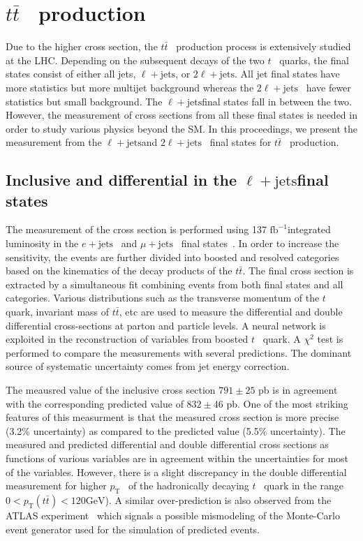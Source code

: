 \documentclass[submission, Proceedings]{SciPost}
\newcommand{\fbinv}{\ensuremath{{\text{fb}^{-1}}}{}}
\newcommand{\GeV}{\ensuremath{{\text{GeV}}}}
\newcommand{\pt}{\ensuremath{{p_\text{T}}}}
\newcommand{\Pe}{\ensuremath{{e}}}
\newcommand{\PQt}{\ensuremath{{t}}}
\newcommand{\PAQt}{\ensuremath{{\bar{t}}}}
\newcommand{\ttbar}{{\PQt\PAQt}}
\newcommand{\ljets}{\ensuremath{\ell + \text{jets}}}
\newcommand{\dilep}{\ensuremath{2\ell + \text{jets}}}
\newcommand{\mujets}{\ensuremath{\mu + \text{jets}}}
\newcommand{\ejets}{\ensuremath{\Pe + \text{jets}}}
\begin{document}
\section{\ttbar~ production}
\label{sec:tt}
Due to the higher cross section, the \ttbar~ production process is extensively studied at the LHC.
Depending on the subsequent decays of the two \PQt~ quarks, the final states consist of either all
jets, \ljets, or \dilep. All jet final states have more statistics but more multijet background whereas the \dilep~ have fewer statistics but small background. The \ljets final states fall in 
between the two. However, the measurement of cross sections from all these final states is needed
in order to study various physics beyond the SM. In this proceedings, we present the measurement 
from the \ljets and \dilep~ final states for \ttbar~ production.


\subsection{Inclusive and differential in the \ljets final states}
The measurement of the cross section is performed using 137 \fbinv integrated luminosity in the 
\ejets~ and \mujets~ final states~\cite{CMS-PAS-TOP-20-001}. In order to increase the sensitivity, 
the events are further divided into boosted and resolved categories based on the kinematics of the
decay products of the \ttbar. The final cross section is extracted by a simultaneous fit combining 
events from both final states and all categories. Various distributions such as the transverse 
momentum of the \PQt~ quark, invariant mass of \ttbar, etc are used to measure the differential and 
double differential cross-sections at parton and particle levels. A neural network is exploited in the 
reconstruction of variables from boosted \PQt~ quark. A $\chi^2$ test is performed to compare the 
measurements with several predictions. The dominant source of systematic uncertainty comes from 
jet energy correction.

The meausred value of the inclusive cross section $791\pm 25$ pb 
is in agreement with the corresponding predicted value of $832\pm 46$ pb. One of the most 
striking features of this measurment is that the measured cross section is more precise 
(3.2\% uncertainty) as compared to the predicted value (5.5\% uncertainty). The measured and 
predicted differential and double differential cross sections as functions of various variables are 
in agreement within the uncertainties for most of the variables. However, there is a slight 
discrepancy in the double differential measurement for higher \pt~ of the hadronically decaying \PQt~
quark in the range $ 0 < \pt (\ttbar) < 120 \GeV$). A similar over-prediction is 
also observed from the ATLAS experiment~\cite{ATLAS:2020ccu} which signals a possible mismodeling 
of the Monte-Carlo event generator used for the simulation of predicted events. 
\end{document}
